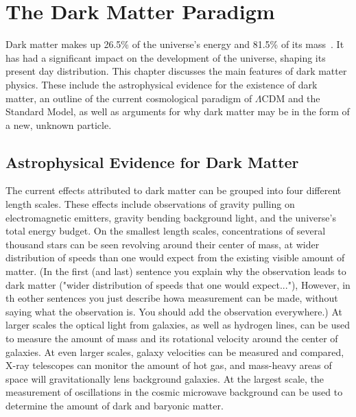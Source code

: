 \cleartooddpage[\thispagestyle{empty}]
\newcommand{\thetamc}{\theta_{\textrm{MC}}}
\newcommand{\mlratio}{$\left [ \frac{M_\odot}{L_\odot} \right ]$}
\chapter{The Dark Matter Paradigm}\label{ch_dm}

Dark matter makes up 26.5\% of the universe's energy and 81.5\% of its mass~\cite{planck2015}.
It has had a significant impact on the development of the universe, shaping its present day distribution.
This chapter discusses the main features of dark matter physics.
These include the astrophysical evidence for the existence of dark matter, an outline of the current cosmological paradigm of $\Lambda$CDM and the Standard Model, as well as arguments for why dark matter may be in the form of a new, unknown particle.


\section{Astrophysical Evidence for Dark Matter}
  
The current effects attributed to dark matter can be grouped into four different length scales.
These effects include observations of gravity pulling on electromagnetic emitters, gravity bending background light, and the universe's total energy budget.
On the smallest length scales, concentrations of several thousand stars can be seen revolving around their center of mass, at wider distribution of speeds than one would expect from the existing visible amount of matter.
{\color{red}(In the first (and last) sentence you explain why the observation leads to dark matter ("wider distribution of speeds that one would expect..."), However, in th eother sentences you just describe howa  measurement can be made, without saying what the observation is.  You should add the observation everywhere.)}
At larger scales the optical light from galaxies, as well as hydrogen lines, can be used to measure the amount of mass and its rotational velocity around the center of galaxies.
At even larger scales, galaxy velocities can be measured and compared, X-ray telescopes can monitor the amount of hot gas, and mass-heavy areas of space will gravitationally lens background galaxies.
At the largest scale, the measurement of oscillations in the cosmic microwave background can be used to determine the amount of dark and baryonic matter.

